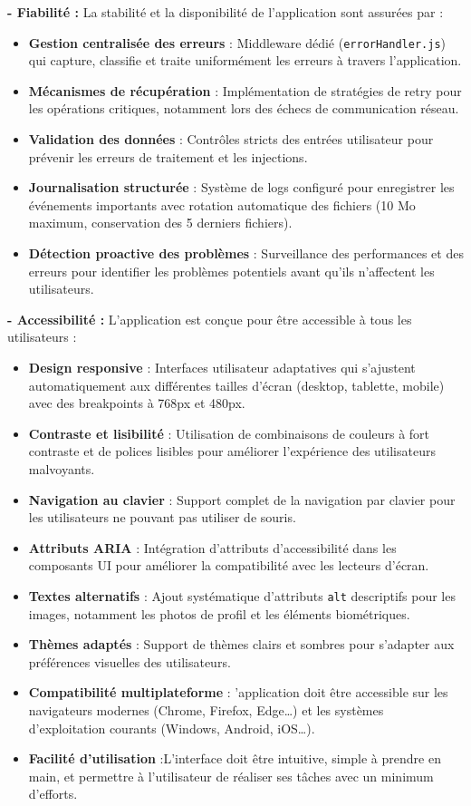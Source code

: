 \textbf{- Fiabilité :} La stabilité et la disponibilité de l'application sont assurées par :
\begin{itemize}[label=$\circ$]
  \item \textbf{Gestion centralisée des erreurs} : Middleware dédié (\texttt{errorHandler.js}) qui capture, classifie et traite uniformément les erreurs à travers l'application.
  \item \textbf{Mécanismes de récupération} : Implémentation de stratégies de retry pour les opérations critiques, notamment lors des échecs de communication réseau.
  \item \textbf{Validation des données} : Contrôles stricts des entrées utilisateur pour prévenir les erreurs de traitement et les injections.
  \item \textbf{Journalisation structurée} : Système de logs configuré pour enregistrer les événements importants avec rotation automatique des fichiers (10 Mo maximum, conservation des 5 derniers fichiers).
  \item \textbf{Détection proactive des problèmes} : Surveillance des performances et des erreurs pour identifier les problèmes potentiels avant qu'ils n'affectent les utilisateurs.
\end{itemize}

\textbf{- Accessibilité :} L'application est conçue pour être accessible à tous les utilisateurs :
\begin{itemize}[label=$\circ$]
  \item \textbf{Design responsive} : Interfaces utilisateur adaptatives qui s'ajustent automatiquement aux différentes tailles d'écran (desktop, tablette, mobile) avec des breakpoints à 768px et 480px.
  \item \textbf{Contraste et lisibilité} : Utilisation de combinaisons de couleurs à fort contraste et de polices lisibles pour améliorer l'expérience des utilisateurs malvoyants.
  \item \textbf{Navigation au clavier} : Support complet de la navigation par clavier pour les utilisateurs ne pouvant pas utiliser de souris.
  \item \textbf{Attributs ARIA} : Intégration d'attributs d'accessibilité dans les composants UI pour améliorer la compatibilité avec les lecteurs d'écran.
  \item \textbf{Textes alternatifs} : Ajout systématique d'attributs \texttt{alt} descriptifs pour les images, notamment les photos de profil et les éléments biométriques.
  \item \textbf{Thèmes adaptés} : Support de thèmes clairs et sombres pour s'adapter aux préférences visuelles des utilisateurs.
  \item \textbf{Compatibilité multiplateforme} : ’application doit être accessible sur les navigateurs modernes (Chrome, Firefox, Edge…) et les systèmes d’exploitation courants (Windows, Android, iOS…).
  \item \textbf{Facilité d’utilisation} :L’interface doit être intuitive, simple à prendre en main, et permettre à l’utilisateur de réaliser ses tâches avec un minimum d’efforts.


\end{itemize}
